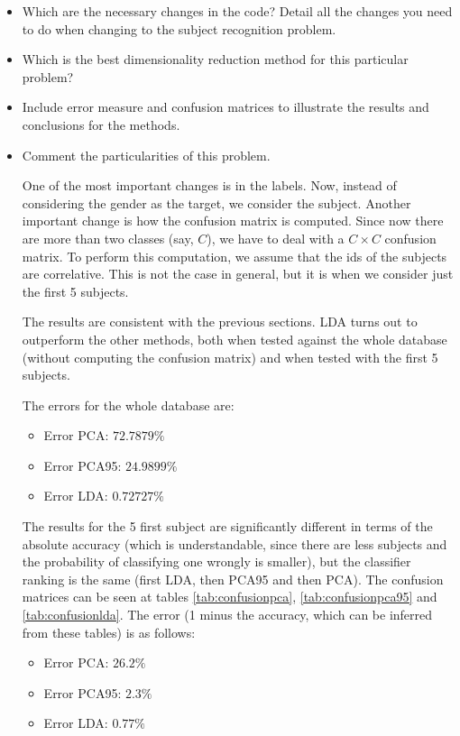 \begin{itemize}
\item Which are the necessary changes in the code? Detail all the changes you
need to do when changing to the subject recognition problem.
\item Which is the best dimensionality reduction method for this particular problem?
\item Include error measure and confusion matrices to illustrate the results and
conclusions for the methods.
\item Comment the particularities of this problem.

One of the most important changes is in the labels. Now, instead of considering the gender as the target, we consider the subject. Another important change is how the confusion matrix is computed. Since now there are more than two classes (say, $ C $), we have to deal with a $ C \times C $ confusion matrix. To perform this computation, we assume that the ids of the subjects are correlative. This is not the case in general, but it is when we consider just the first 5 subjects.

The results are consistent with the previous sections. LDA turns out to outperform the other methods, both when tested against the whole database (without computing the confusion matrix) and when tested with the first 5 subjects.

The errors for the whole database are:
\begin{itemize}
	\item Error PCA: $72.7879 \%$
	\item Error PCA95: $24.9899 \%$
	\item Error LDA: $0.72727 \%$
\end{itemize}

The results for the 5 first subject are significantly different in terms of the absolute accuracy (which is understandable, since there are less subjects and the probability of classifying one wrongly is smaller), but the classifier ranking is the same (first LDA, then PCA95 and then PCA). The confusion matrices can be seen at tables \ref{tab:confusionpca}, \ref{tab:confusionpca95} and \ref{tab:confusionlda}. The error (1 minus the accuracy, which can be inferred from these tables) is as follows:
\begin{itemize}
	\item Error PCA: $ 26.2 \%$
	\item Error PCA95: $ 2.3 \%$
	\item Error LDA: $0.77 \%$
\end{itemize}


\end{itemize}
